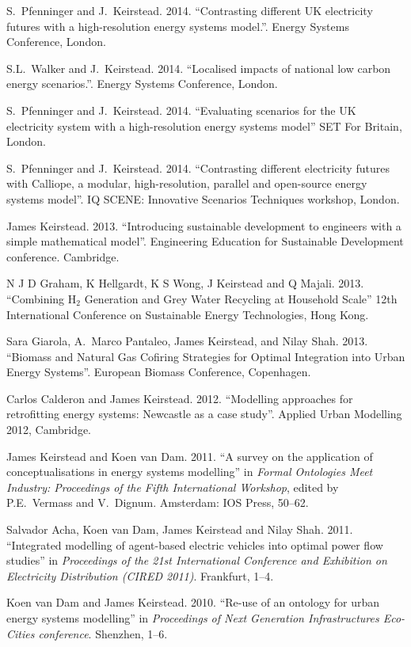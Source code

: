 \documentclass[11pt,a4paper]{article}
\begin{document}
\ind S.\ Pfenninger and J.\ Keirstead. 2014. ``Contrasting different UK electricity futures with a high-resolution energy systems model.''.  Energy Systems Conference, London.

\ind S.L.\ Walker and J.\ Keirstead. 2014. ``Localised impacts of national low carbon energy scenarios.''.  Energy Systems Conference, London.

\ind S.\ Pfenninger and J.\ Keirstead. 2014. ``Evaluating scenarios for the UK electricity system with a high-resolution energy systems model'' SET For Britain, London.

\ind S.\ Pfenninger and J.\ Keirstead. 2014. ``Contrasting different electricity futures with Calliope, a modular, high-resolution, parallel and open-source energy systems model''.  IQ SCENE: Innovative Scenarios Techniques workshop, London.

\ind James Keirstead. 2013. ``Introducing sustainable development to engineers with a simple mathematical model''.  Engineering Education for Sustainable Development conference.  Cambridge.

\ind N J D Graham, K Hellgardt, K S Wong, J Keirstead and Q Majali. 2013. ``Combining H$_2$ Generation and Grey Water Recycling at Household Scale'' 12th International Conference on Sustainable Energy Technologies, Hong Kong.

\ind Sara Giarola, A.\ Marco Pantaleo, James Keirstead, and Nilay Shah. 2013. ``Biomass and Natural Gas Cofiring Strategies for Optimal Integration into Urban Energy Systems''.  European Biomass Conference, Copenhagen.

\ind Carlos Calderon and James Keirstead. 2012. ``Modelling approaches for retrofitting energy systems: Newcastle as a case study''.  Applied Urban Modelling 2012, Cambridge.

\ind James Keirstead and Koen van Dam. 2011. ``A survey on the application of conceptualisations in energy systems modelling'' in \emph{Formal Ontologies Meet Industry: Proceedings of the Fifth International Workshop}, edited by P.E.\ Vermass and V.\ Dignum.  Amsterdam: IOS Press, 50--62.

\ind Salvador Acha, Koen van Dam, James Keirstead and Nilay Shah. 2011. ``Integrated modelling of agent-based electric vehicles into optimal power flow studies'' in \emph{Proceedings of the 21st International Conference and Exhibition on Electricity Distribution (CIRED 2011)}.  Frankfurt, 1--4.

\ind Koen van Dam and James Keirstead. 2010. ``Re-use of an ontology for urban energy systems modelling'' in \emph{Proceedings of Next Generation Infrastructures Eco-Cities conference}.  Shenzhen, 1--6.
\end{document}

